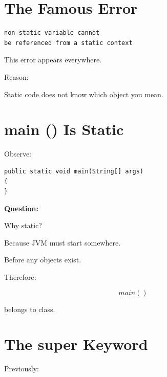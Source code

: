 \documentclass[11pt,a4paper]{book}
\begin{document}
\section{The Famous Error}

\begin{verbatim}
non-static variable cannot
be referenced from a static context
\end{verbatim}


This error appears everywhere.


Reason:

Static code does not know
which object you mean.


\section{main () Is Static}

Observe:

\begin{verbatim}
public static void main(String[] args)
{
}
\end{verbatim}


\textbf{Question:}

Why static?


Because JVM must start somewhere.


Before any objects exist.


Therefore:

\[
main()
\]

belongs to class.


\section{The super Keyword}

Previously:
\end{document}

